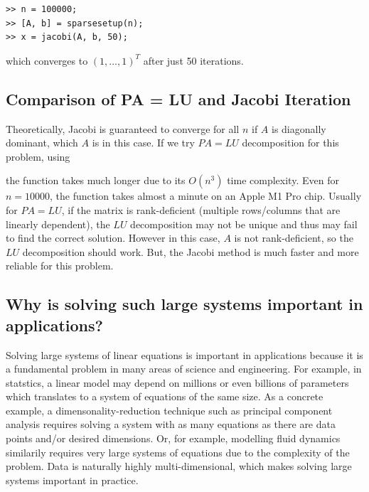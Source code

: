 \documentclass[11pt]{article}
\begin{document}
\begin{verbatim}
>> n = 100000;
>> [A, b] = sparsesetup(n);
>> x = jacobi(A, b, 50);
\end{verbatim}

which converges to $(1, \dots, 1)^T$ after just 50 iterations.





\subsection{Comparison of PA = LU and Jacobi Iteration}

Theoretically, Jacobi is guaranteed to converge for all $n$ if $A$ is diagonally dominant, which $A$ is in this case. If we try $PA = LU$ decomposition for this problem, using



the function takes much longer due to its $O(n^3)$ time complexity. Even for $n = 10000$, the function takes almost a minute on an Apple M1 Pro chip. Usually for $PA = LU$, if the matrix is rank-deficient (multiple rows/columns that are linearly dependent), the $LU$ decomposition may not be unique and thus may fail to find the correct solution. However in this case, $A$ is not rank-deficient, so the $LU$ decomposition should work. But, the Jacobi method is much faster and more reliable for this problem.

\subsection{Why is solving such large systems important in applications?}

Solving large systems of linear equations is important in applications because it is a fundamental problem in many areas of science and engineering. For example, in statstics, a linear model may depend on millions or even billions of parameters which translates to a system of equations of the same size. As a concrete example, a dimensonality-reduction technique such as principal component analysis requires solving a system with as many equations as there are data points and/or desired dimensions. Or, for example, modelling fluid dynamics similarily requires very large systems of equations due to the complexity of the problem. Data is naturally highly multi-dimensional, which makes solving large systems important in practice.
\end{document}
